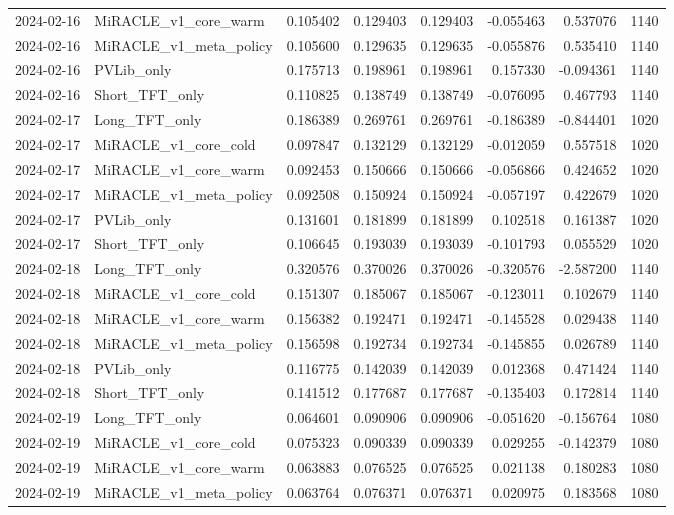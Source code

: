 \begin{tabular}{llrrrrrr}
2024-02-16 & MiRACLE_v1_core_warm & 0.105402 & 0.129403 & 0.129403 & -0.055463 & 0.537076 & 1140 \\
2024-02-16 & MiRACLE_v1_meta_policy & 0.105600 & 0.129635 & 0.129635 & -0.055876 & 0.535410 & 1140 \\
2024-02-16 & PVLib_only & 0.175713 & 0.198961 & 0.198961 & 0.157330 & -0.094361 & 1140 \\
2024-02-16 & Short_TFT_only & 0.110825 & 0.138749 & 0.138749 & -0.076095 & 0.467793 & 1140 \\
2024-02-17 & Long_TFT_only & 0.186389 & 0.269761 & 0.269761 & -0.186389 & -0.844401 & 1020 \\
2024-02-17 & MiRACLE_v1_core_cold & 0.097847 & 0.132129 & 0.132129 & -0.012059 & 0.557518 & 1020 \\
2024-02-17 & MiRACLE_v1_core_warm & 0.092453 & 0.150666 & 0.150666 & -0.056866 & 0.424652 & 1020 \\
2024-02-17 & MiRACLE_v1_meta_policy & 0.092508 & 0.150924 & 0.150924 & -0.057197 & 0.422679 & 1020 \\
2024-02-17 & PVLib_only & 0.131601 & 0.181899 & 0.181899 & 0.102518 & 0.161387 & 1020 \\
2024-02-17 & Short_TFT_only & 0.106645 & 0.193039 & 0.193039 & -0.101793 & 0.055529 & 1020 \\
2024-02-18 & Long_TFT_only & 0.320576 & 0.370026 & 0.370026 & -0.320576 & -2.587200 & 1140 \\
2024-02-18 & MiRACLE_v1_core_cold & 0.151307 & 0.185067 & 0.185067 & -0.123011 & 0.102679 & 1140 \\
2024-02-18 & MiRACLE_v1_core_warm & 0.156382 & 0.192471 & 0.192471 & -0.145528 & 0.029438 & 1140 \\
2024-02-18 & MiRACLE_v1_meta_policy & 0.156598 & 0.192734 & 0.192734 & -0.145855 & 0.026789 & 1140 \\
2024-02-18 & PVLib_only & 0.116775 & 0.142039 & 0.142039 & 0.012368 & 0.471424 & 1140 \\
2024-02-18 & Short_TFT_only & 0.141512 & 0.177687 & 0.177687 & -0.135403 & 0.172814 & 1140 \\
2024-02-19 & Long_TFT_only & 0.064601 & 0.090906 & 0.090906 & -0.051620 & -0.156764 & 1080 \\
2024-02-19 & MiRACLE_v1_core_cold & 0.075323 & 0.090339 & 0.090339 & 0.029255 & -0.142379 & 1080 \\
2024-02-19 & MiRACLE_v1_core_warm & 0.063883 & 0.076525 & 0.076525 & 0.021138 & 0.180283 & 1080 \\
2024-02-19 & MiRACLE_v1_meta_policy & 0.063764 & 0.076371 & 0.076371 & 0.020975 & 0.183568 & 1080 \\

\end{tabular}
